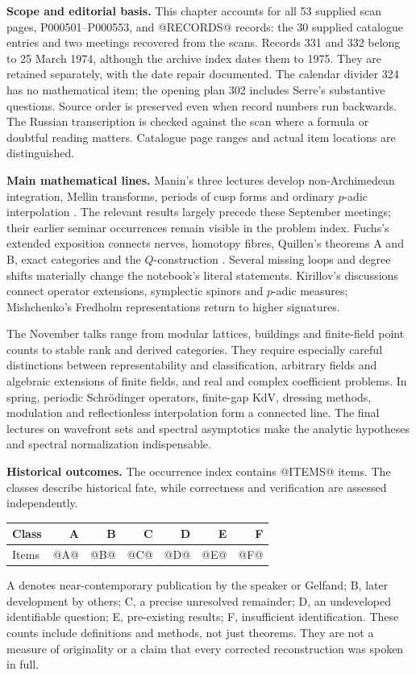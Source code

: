 \noindent\textbf{Scope and editorial basis.}
This chapter accounts for all 53 supplied scan pages, P000501--P000553, and
@RECORDS@ records: the 30 supplied catalogue entries and two meetings recovered
from the scans. Records 331 and 332 belong to 25 March 1974, although the
archive index dates them to 1975. They are retained separately, with the date
repair documented. The calendar divider 324 has no mathematical item; the
opening plan 302 includes Serre's substantive questions. Source order is
preserved even when record numbers run backwards. The Russian transcription
is checked against the scan where a formula or doubtful reading matters.
Catalogue page ranges and actual item locations are distinguished.

\medskip\noindent\textbf{Main mathematical lines.}
Manin's three lectures develop non-Archimedean integration, Mellin transforms,
periods of cusp forms and ordinary \(p\)-adic interpolation
\citep{manin1973periods}. The relevant
results largely precede these September meetings; their earlier seminar
occurrences remain visible in the problem index. Fuchs's extended exposition
connects nerves, homotopy fibres, Quillen's theorems A and B, exact categories
and the \(Q\)-construction \citep{quillen1973higher}. Several missing loops and degree shifts materially
change the notebook's literal statements. Kirillov's discussions connect
operator extensions, symplectic spinors and \(p\)-adic measures; Mishchenko's
Fredholm representations return to higher signatures.

The November talks range from modular lattices, buildings and finite-field
point counts to stable rank and derived categories. They require especially
careful distinctions between representability and classification, arbitrary
fields and algebraic extensions of finite fields, and real and complex
coefficient problems. In spring, periodic Schr\"odinger operators, finite-gap
KdV, dressing methods, modulation and reflectionless interpolation form a
connected line. The final lectures on wavefront sets and spectral asymptotics
make the analytic hypotheses and spectral normalization indispensable.

\medskip\noindent\textbf{Historical outcomes.}
The occurrence index contains @ITEMS@ items. The classes describe historical
fate, while correctness and verification are assessed independently.
\begin{center}
\begin{tabular}{@{}lrrrrrr@{}}
\toprule
Class & A & B & C & D & E & F\\
\midrule
Items & @A@ & @B@ & @C@ & @D@ & @E@ & @F@\\
\bottomrule
\end{tabular}
\end{center}
\noindent
A denotes near-contemporary publication by the speaker or Gelfand; B, later
development by others; C, a precise unresolved remainder; D, an undeveloped
identifiable question; E, pre-existing results; F, insufficient identification.
These counts include definitions and methods, not just theorems. They are
not a measure of originality or a claim that every corrected reconstruction
was spoken in full.

